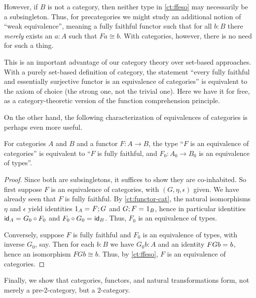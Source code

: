 However, if $B$ is not a category, then neither type in \autoref{ct:ffeso} may necessarily be a subsingleton.  Thus, for precategories we might study an additional notion of ``weak equivalence'', meaning a fully faithful functor such that for all $b:B$ there \emph{merely} exists an $a:A$ such that $Fa\cong b$.  With categories, however, there is no need for such a thing.

This is an important advantage of our category theory over set-based approaches.  With a purely set-based definition of category, the statement ``every fully faithful and essentially surjective functor is an equivalence of categories'' is equivalent to the axiom of choice (the strong one, not the trivial one).  Here we have it for free, as a category-theoretic version of the function comprehension principle.

On the other hand, the following characterization of equivalences of categories is perhaps even more useful.

\begin{lem}\label{ct:eqv-levelwise}
  For categories $A$ and $B$ and a functor $F:A\to B$, the type ``$F$ is an equivalence of categories'' is equivalent to ``$F$ is fully faithful, and $F_0:A_0\to B_0$ is an equivalence of types''.
\end{lem}
\begin{proof}
  Since both are subsingletons, it suffices to show they are co-inhabited.  So first suppose $F$ is an equivalence of categories, with $(G,\eta,\epsilon)$ given.  We have already seen that $F$ is fully faithful.  By \autoref{ct:functor-cat}, the natural isomorphisms $\eta$ and $\epsilon$ yield identities $\id{1_A}{F;G}$ and $\id{G;F}{1_B}$, hence in particular identities $\id{\idfunc[A]}{G_0\circ F_0}$ and $\id{F_0\circ G_0}{\idfunc[B]}$.  Thus, $F_0$ is an equivalence of types.

  Conversely, suppose $F$ is fully faithful and $F_0$ is an equivalence of types, with inverse $G_0$, say.  Then for each $b:B$ we have $G_0 b:A$ and an identity $\id{FGb}{b}$, hence an isomorphism $FGb\cong b$.  Thus, by \autoref{ct:ffeso}, $F$ is an equivalence of categories.
\end{proof}

Finally, we show that categories, functors, and natural transformations form, not merely a pre-2-category, but a 2-category.

